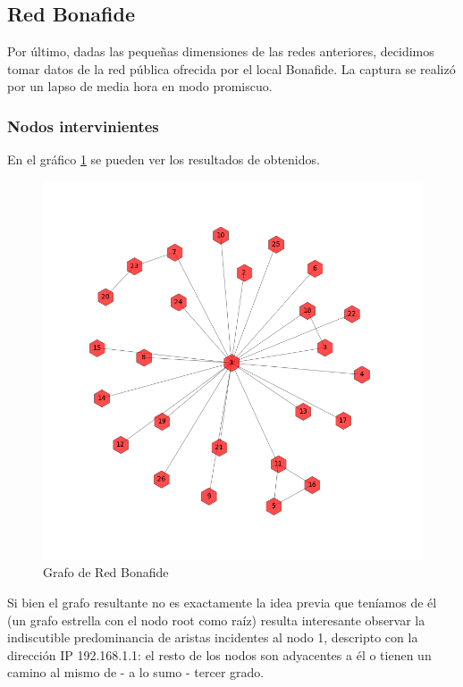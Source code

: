 \newpage
\subsection{Red Bonafide}
 Por \'ultimo, dadas las peque\~nas dimensiones de las redes anteriores, decidimos tomar datos de la red p\'ublica ofrecida por el local Bonafide. La captura se realiz\'o por un lapso de media hora en modo promiscuo.

\subsubsection{Nodos intervinientes}

En el gr\'afico \ref{bonafideGraph} se pueden ver los resultados de obtenidos.

\begin{figure}[h!]
    \centering                                                       
    \includegraphics[width=400pt]{img/bonafideGraph.png}
    \caption{Grafo de Red Bonafide}
    \label{bonafideGraph}
\end{figure}
Si bien el grafo resultante no es exactamente la idea previa que ten\'iamos de \'el (un grafo estrella con el nodo root como ra\'iz) resulta interesante observar la indiscutible predominancia de aristas incidentes al nodo 1, descripto con la direcci\'on IP 192.168.1.1: el resto de los nodos son adyacentes a \'el o tienen un camino al mismo de - a lo sumo - tercer grado.\\
